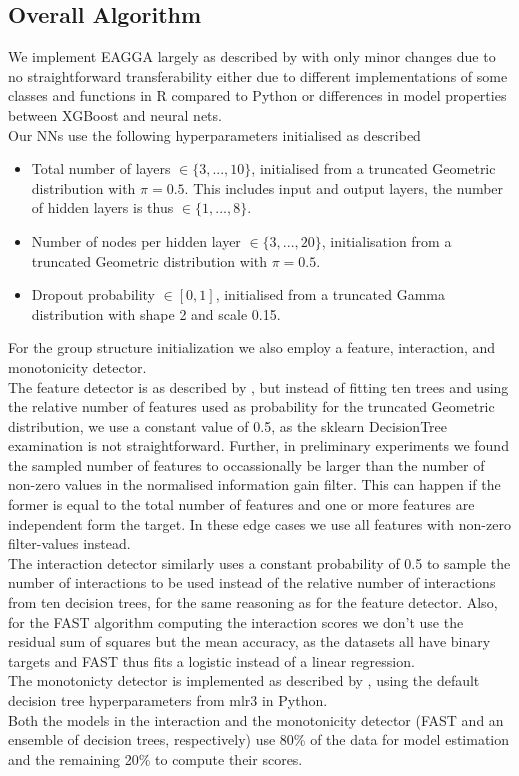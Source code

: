 \documentclass[twoside,11pt]{article}
\begin{document}
\subsection{Overall Algorithm}
We implement EAGGA largely as described by \citet{EAGGA} with only minor changes due to no straightforward transferability either due to different implementations
of some classes and functions in R compared to Python or differences in model properties between XGBoost and neural nets.\\
Our NNs use the following hyperparameters initialised as described
\begin{itemize}
  \item Total number of layers $\in\{3, ..., 10\}$, initialised from a truncated Geometric distribution with $\pi=0.5$.
        This includes input and output layers, the number of hidden layers is thus $\in\{1, ..., 8\}$.
  \item Number of nodes per hidden layer $\in\{3, ..., 20\}$, initialisation from a truncated Geometric distribution with $\pi=0.5$.
  \item Dropout probability $\in[0, 1]$, initialised from a truncated Gamma distribution with shape 2 and scale 0.15.
\end{itemize}
For the group structure initialization we also employ a feature, interaction, and monotonicity detector.
\\
The feature detector is as described by \citet[p. 542]{EAGGA}, but instead of fitting ten trees and using the relative number of features used as
probability for the truncated Geometric distribution, we use a constant value of 0.5, as the sklearn DecisionTree examination is not straightforward.
Further, in preliminary experiments we found the sampled number of features to occassionally be larger than the number of non-zero values in the
normalised information gain filter. This can happen if the former is equal to the total number of features and one or more features are independent form the
target. In these edge cases we use all features with non-zero filter-values instead.
\\
The interaction detector similarly uses a constant probability of 0.5 to sample the number of interactions to be used instead of the relative number of interactions
from ten decision trees, for the same reasoning as for the feature detector. Also, for the FAST algorithm computing the interaction scores we don't use the residual
sum of squares but the mean accuracy, as the datasets all have binary targets and FAST thus fits a logistic instead of a linear regression.
\\
The monotonicty detector is implemented as described by \citet[p. 543]{EAGGA}, using the default decision tree hyperparameters from mlr3 in Python.
\\
Both the models in the interaction and the monotonicity detector (FAST and an ensemble of decision trees, respectively) use 80\% of the data for model estimation and
the remaining 20\% to compute their scores.
\end{document}
